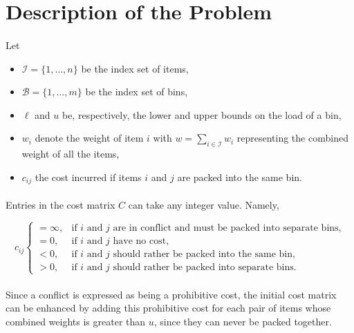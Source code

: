 \documentclass{llncs}
\begin{document}
\section{Description of the Problem}
\label{sec:description_of_the_problem}


\paragraph{}Let

\begin{itemize}
\item $\mathcal{I} = \{1, \dots, n\}$ be the index set of items,
\item $\mathcal{B} = \{1, \dots, m\}$ be the index set of bins,
\item $\ell$ and $u$ be, respectively, the lower and upper bounds on the load of a bin,
\item $w_{i}$ denote the weight of item $i$ with $w = \sum_{i \in \mathcal{I}} w_{i}$ representing the combined weight of all the items,
\item $c_{ij}$ the cost incurred if items $i$ and $j$ are packed into the same bin.
\end{itemize}

\paragraph{}Entries in the cost matrix $C$ can take any integer value. Namely,

\begin{equation*}
  c_{ij}
  \begin{cases}
    =\infty, & \mbox{if $i$ and $j$ are in conflict and must be packed into separate bins,} \\
    =0,      & \mbox{if $i$ and $j$ have no cost,}                                          \\
    <0,      & \mbox{if $i$ and $j$ should rather be packed into the same bin,}             \\
    >0,      & \mbox{if $i$ and $j$ should rather be packed into separate bins.}
  \end{cases}
\end{equation*}

\paragraph{}Since a conflict is expressed as being a prohibitive cost, the initial cost matrix can be enhanced by adding this prohibitive cost for each pair of items whose combined weights is greater than $u$, since they can never be packed together.
\end{document}
